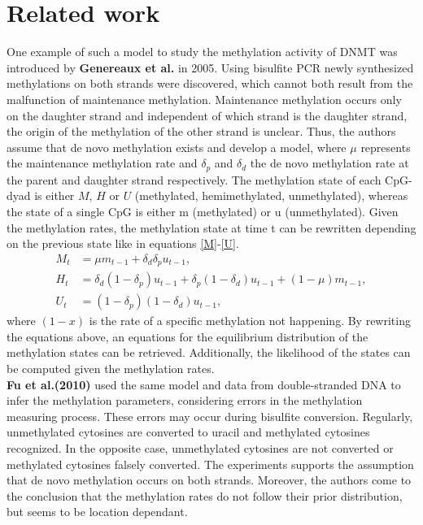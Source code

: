 \section{Related work} 
\label{section:RelWork}
One example of such a model to study the methylation activity of \ac{DNMT} was introduced by \textbf{Genereaux et al.}\cite{Genereaux} in 2005. Using bisulfite \ac{PCR} newly synthesized methylations on both strands were discovered, which cannot both result from the malfunction of maintenance methylation. Maintenance methylation occurs only on the daughter strand and independent of which strand is the daughter strand, the origin of the methylation of the other strand is unclear. Thus, the authors assume that de novo methylation exists and develop a model, where $\mu$ represents the maintenance methylation rate and $\delta_p$ and $\delta_d$ the de novo methylation rate at the parent and daughter strand respectively. The methylation state of each \ac{CpG}-dyad is either $M$, $H$ or $U$ (methylated, hemimethylated, unmethylated), whereas the state of a single \ac{CpG} is either m (methylated) or u (unmethylated). Given the methylation rates, the methylation state at time t can be rewritten depending on the previous state like in equations \ref{M}-\ref{U}.
\begin{align}
M_t &= \mu m_{t-1} + \delta_d \delta_p u_{t-1},\label{M}\\
H_t &= \delta_d (1- \delta_p) u_{t-1} + \delta_p (1- \delta_d) u_{t-1} + (1-\mu) m_{t-1},\\
U_t &= (1- \delta_p) (1- \delta_d) u_{t-1},\label{U}
\end{align}
where $(1-x)$ is the rate of a specific methylation not happening.\newline
By rewriting the equations above, an equations for the equilibrium distribution of the methylation states can be retrieved. Additionally, the likelihood of the states can be computed given the methylation rates.\\

\textbf{Fu et al.(2010)}\cite{errors} used the same model and data from double-stranded DNA to infer the methylation parameters, considering errors in the methylation measuring process. These errors may occur during bisulfite conversion. Regularly, unmethylated cytosines are converted to uracil and methylated cytosines recognized. In the opposite case, unmethylated cytosines are not converted or methylated cytosines falsely converted. The experiments supports the assumption that de novo methylation occurs on both strands. Moreover, the authors come to the conclusion that the methylation rates do not follow their prior distribution, but seems to be location dependant.\\

